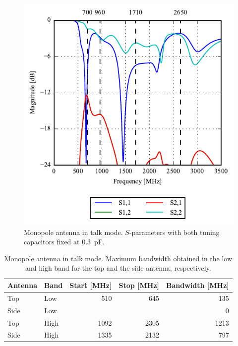 \begin{figure}[htbp]
    \centering
    \includegraphics{img/tech_sol/monopole/talk_mode/sparams_talk.pdf}
    \caption{Monopole antenna in talk mode. $S$-parameters with both tuning capacitors fixed at \SI{0.3}{pF}.}
    \label{fig:mono_talk_sparam_data}
\end{figure}

\begin{table}[htbp]
    \centering
    \begin{tabular}{|l|l|r|r|r|}
        \hline
        Antenna & Band & Start [MHz] & Stop [MHz] & Bandwidth [MHz] \\
        \hline
        Top     & Low  & 510 & 645  & 135 \\
        Side    & Low  & & & 0    \\
        \hline
        Top     & High & 1092 & 2305  & 1213 \\
        Side    & High & 1335  & 2132 & 797 \\
        \hline
    \end{tabular}
    \caption{Monopole antenna in talk mode. Maximum bandwidth obtained in the low and high band for the top and the side antenna, respectively.}
    \label{tab:bw_sol1talk}
\end{table}

